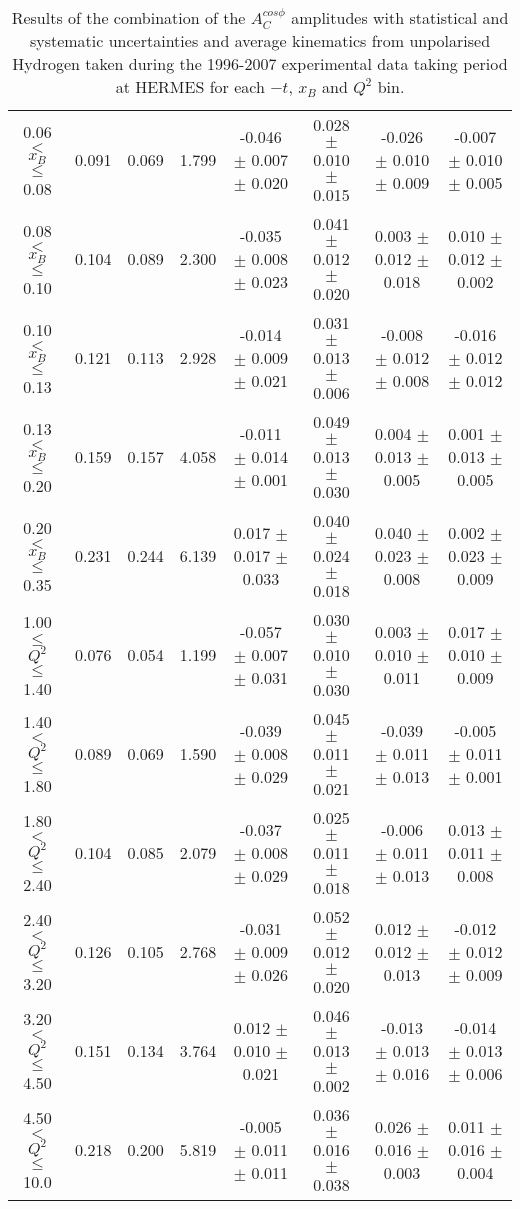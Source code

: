 {\begin{table}[width=15cm]
\begin{center}
{\begin{tabular}{|c|c|c|c|c|c|c|c|}
0.06 $<$ $x_{B}$ $\leqslant$ 0.08 &  0.091 & 0.069 &  1.799 &   -0.046  $\pm$  0.007  $\pm$   0.020 &
0.028  $\pm$  0.010  $\pm$   0.015 & -0.026  $\pm$ 0.010  $\pm$  0.009 & -0.007   $\pm$  0.010   $\pm$   0.005\\
0.08 $<$ $x_{B}$ $\leqslant$ 0.10 &  0.104 & 0.089 &  2.300 &  -0.035  $\pm$  0.008  $\pm$   0.023 & 
0.041  $\pm$  0.012  $\pm$   0.020 & 0.003 $\pm$  0.012 $\pm$    0.018 & 0.010   $\pm$  0.012    $\pm$  0.002\\
0.10 $<$ $x_{B}$ $\leqslant$ 0.13 &  0.121 &  0.113 &  2.928 &  -0.014  $\pm$  0.009  $\pm$   0.021 & 
0.031  $\pm$  0.013 $\pm$   0.006 & -0.008 $\pm$  0.012  $\pm$   0.008 & -0.016   $\pm$  0.012  $\pm$    0.012\\
0.13 $<$ $x_{B}$ $\leqslant$ 0.20 &  0.159 & 0.157 &  4.058&   -0.011   $\pm$ 0.014  $\pm$   0.001 & 
0.049  $\pm$  0.013 $\pm$    0.030 & 0.004  $\pm$  0.013  $\pm$   0.005 & 0.001   $\pm$  0.013   $\pm$  0.005\\
0.20 $<$ $x_{B}$ $\leqslant$ 0.35 &  0.231 & 0.244 &  6.139 &  0.017 $\pm$  0.017   $\pm$  0.033 & 
0.040  $\pm$  0.024   $\pm$  0.018 & 0.040  $\pm$  0.023  $\pm$   0.008 & 0.002  $\pm$   0.023  $\pm$   0.009\\
\hline
1.00 $\leqslant$ $Q^{2}$ $\leqslant$ 1.40 &  0.076 & 0.054  & 1.199 &  -0.057  $\pm$  0.007  $\pm$   0.031 & 
0.030  $\pm$  0.010  $\pm$   0.030 &  0.003 $\pm$  0.010  $\pm$  0.011 & 0.017  $\pm$  0.010   $\pm$   0.009\\
1.40 $<$ $Q^{2}$ $\leqslant$ 1.80 &  0.089 & 0.069 &  1.590 &  -0.039  $\pm$  0.008  $\pm$   0.029 & 
0.045  $\pm$  0.011  $\pm$   0.021 & -0.039  $\pm$  0.011  $\pm$  0.013 & -0.005  $\pm$  0.011   $\pm$  0.001\\
1.80 $<$ $Q^{2}$ $\leqslant$ 2.40 &  0.104 & 0.085 &  2.079 &  -0.037  $\pm$  0.008  $\pm$   0.029 &
 0.025  $\pm$  0.011  $\pm$   0.018 & -0.006 $\pm$   0.011  $\pm$  0.013 & 0.013  $\pm$   0.011  $\pm$  0.008\\
2.40 $<$ $Q^{2}$ $\leqslant$ 3.20 &  0.126 & 0.105  & 2.768 &  -0.031 $\pm$   0.009  $\pm$   0.026 &  
0.052  $\pm$  0.012  $\pm$   0.020 & 0.012  $\pm$  0.012  $\pm$  0.013 & -0.012  $\pm$  0.012  $\pm$  0.009\\
3.20 $<$ $Q^{2}$ $\leqslant$ 4.50 &  0.151 & 0.134 &  3.764 &  0.012  $\pm$  0.010   $\pm$  0.021 & 
0.046 $\pm$   0.013  $\pm$   0.002 & -0.013  $\pm$  0.013 $\pm$ 0.016 & -0.014   $\pm$  0.013  $\pm$  0.006\\
4.50 $<$ $Q^{2}$ $\leqslant$ 10.0 &  0.218 & 0.200 &  5.819 &  -0.005  $\pm$  0.011  $\pm$   0.011 & 
0.036  $\pm$  0.016  $\pm$  0.038 & 0.026 $\pm$   0.016  $\pm$  0.003 & 0.011   $\pm$  0.016   $\pm$   0.004\\
\hline
  \end{tabular}
}
 \end{center}
\caption{Results of the combination of the $A_{C}^{cos\phi}$ amplitudes with statistical and systematic uncertainties and average kinematics from unpolarised Hydrogen taken during
the 1996-2007 experimental data taking period at HERMES for each $-t$, $x_{B}$ and $Q^{2}$ bin.}
\end{table}
}